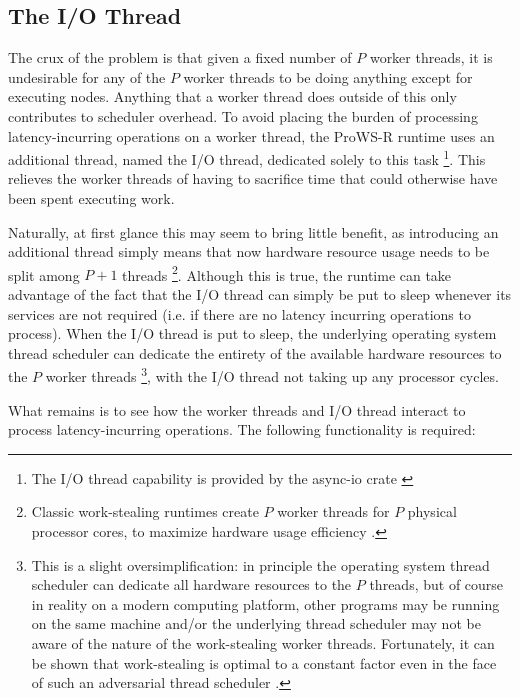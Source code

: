 \documentclass[bsc,frontabs,singlespacing,parskip,deptreport,normalheadings]{infthesis}
\begin{document}
\subsection{The I/O Thread}

The crux of the problem is that given a fixed number of \(P\) worker threads, it
is undesirable for any of the \(P\) worker threads to be doing anything except
for executing nodes. Anything that a worker thread does outside of this only
contributes to scheduler overhead. To avoid placing the burden of processing
latency-incurring operations on a worker thread, the ProWS-R runtime uses an
additional thread, named the I/O thread, dedicated solely to this task
\footnote{The I/O thread capability is provided by the async-io crate
\cite{noauthor_async-io_2022}}. This relieves the worker threads of having to
sacrifice time that could otherwise have been spent executing work.

Naturally, at first glance this may seem to bring little benefit, as introducing
an additional thread simply means that now hardware resource usage needs to be
split among \(P + 1\) threads \footnote{Classic work-stealing runtimes create
    \(P\) worker threads for \(P\) physical processor cores, to maximize
hardware usage efficiency \cite{arora_thread_1998}.}. Although this is true, the
runtime can take advantage of the fact that the I/O thread can simply be put to
sleep whenever its services are not required (i.e. if there are no latency
incurring operations to process). When the I/O thread is put to sleep, the
underlying operating system thread scheduler can dedicate the entirety of the
available hardware resources to the \(P\) worker threads \footnote{This is a
    slight oversimplification: in principle the operating system thread
    scheduler can dedicate all hardware resources to the \(P\) threads, but of
    course in reality on a modern computing platform, other programs may be
    running on the same machine and/or the underlying thread scheduler may not
    be aware of the nature of the work-stealing worker threads. Fortunately, it
can be shown that work-stealing is optimal to a constant factor even in the face
of such an adversarial thread scheduler \cite{arora_thread_1998}.}, with the I/O
thread not taking up any processor cycles.

What remains is to see how the worker threads and I/O thread interact to process
latency-incurring operations. The following functionality is required:
\end{document}
